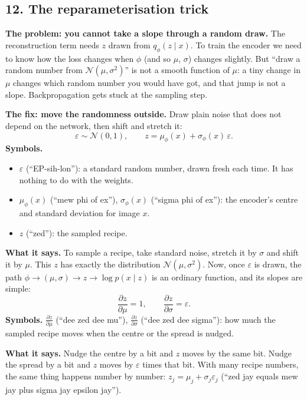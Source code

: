 \subsection*{12. The reparameterisation trick}

\textbf{The problem: you cannot take a slope through a random draw.} The reconstruction term needs $z$ drawn from $q_\phi(z \mid x)$. To train the encoder we need to know how the loss changes when $\phi$ (and so $\mu$, $\sigma$) changes slightly. But ``draw a random number from $\mathcal{N}(\mu, \sigma^2)$'' is not a smooth function of $\mu$: a tiny change in $\mu$ changes which random number you would have got, and that jump is not a slope. Backpropagation gets stuck at the sampling step.

\textbf{The fix: move the randomness outside.} Draw plain noise that does not depend on the network, then shift and stretch it:
\[
\varepsilon \sim \mathcal{N}(0, 1), \qquad z = \mu_\phi(x) + \sigma_\phi(x)\,\varepsilon.
\]
\textbf{Symbols.}
\begin{itemize}[leftmargin=1.5em, itemsep=0pt]
\item $\varepsilon$ (``EP-sih-lon''): a standard random number, drawn fresh each time. It has nothing to do with the weights.
\item $\mu_\phi(x)$ (``mew phi of ex''), $\sigma_\phi(x)$ (``sigma phi of ex''): the encoder's centre and standard deviation for image $x$.
\item $z$ (``zed''): the sampled recipe.
\end{itemize}
\textbf{What it says.} To sample a recipe, take standard noise, stretch it by $\sigma$ and shift it by $\mu$. This $z$ has exactly the distribution $\mathcal{N}(\mu, \sigma^2)$. Now, once $\varepsilon$ is drawn, the path $\phi \to (\mu, \sigma) \to z \to \log p(x \mid z)$ is an ordinary function, and its slopes are simple:
\[
\frac{\partial z}{\partial \mu} = 1, \qquad \frac{\partial z}{\partial \sigma} = \varepsilon.
\]
\textbf{Symbols.} $\frac{\partial z}{\partial \mu}$ (``dee zed dee mu''), $\frac{\partial z}{\partial \sigma}$ (``dee zed dee sigma''): how much the sampled recipe moves when the centre or the spread is nudged.

\textbf{What it says.} Nudge the centre by a bit and $z$ moves by the same bit. Nudge the spread by a bit and $z$ moves by $\varepsilon$ times that bit. With many recipe numbers, the same thing happens number by number: $z_j = \mu_j + \sigma_j\varepsilon_j$ (``zed jay equals mew jay plus sigma jay epsilon jay'').

